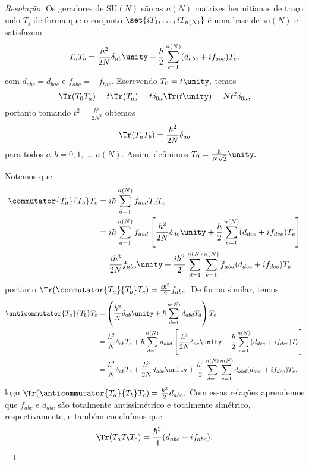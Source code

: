 \begin{proof}[Resolução]
    Os geradores de \(\mathrm{SU}(N)\) são as \(n(N)\) matrizes hermitianas de traço nulo \(T_j\) de forma que o conjunto \(\set{i T_1, \dots, i T_{n(N)}}\) é uma base de \(\mathrm{su}(N)\) e satisfazem
    \begin{equation*}
        T_a T_b = \frac{\hbar^2}{2N} \delta_{ab} \unity + \frac{\hbar}{2} \sum_{c = 1}^{n(N)} (d_{abc} + i f_{abc}) T_c,
    \end{equation*}
    com \(d_{abc} = d_{bac}\) e \(f_{abc} = -f_{bac}.\) Escrevendo \(T_0 = t \unity,\) temos
    \begin{equation*}
        \Tr(T_0 T_a) = t \Tr(T_a) = t \delta_{0a} \Tr(t \unity) = N t^2 \delta_{0a},
    \end{equation*}
    portanto tomando \(t^2 = \frac{\hbar^2}{2N^2}\) obtemos
    \begin{equation*}
        \Tr(T_a T_b) = \frac{\hbar^2}{2N} \delta_{ab}
    \end{equation*}
    para todos \(a,b = 0, 1, \dots, n(N).\) Assim, definimos \(T_0 = \frac{\hbar}{N\sqrt{2}}\unity.\)

    Notemos que
    \begin{align*}
        \commutator{T_a}{T_b}T_c &= i\hbar \sum_{d = 1}^{n(N)} f_{abd} T_d T_c\\
                                 &= i\hbar \sum_{d = 1}^{n(N)} f_{abd}\left[\frac{\hbar^2}{2N} \delta_{dc} \unity + \frac{\hbar}{2} \sum_{e = 1}^{n(N)} (d_{dce} + if_{dce}) T_e\right]\\
                                 &= \frac{i \hbar^3}{2N} f_{abc} \unity + \frac{i\hbar^2}{2} \sum_{d = 1}^{n(N)} \sum_{e = 1}^{n(N)} f_{abd}(d_{dce} + i f_{dce}) T_e
    \end{align*}
    portanto \(\Tr(\commutator{T_a}{T_b}T_c) = \frac{i\hbar^3}{2}f_{abc}\). De forma similar, temos
    \begin{align*}
        \anticommutator{T_a}{T_b}T_c &= \left(\frac{\hbar^2}{N}\delta_{ab} \unity + \hbar \sum_{d = 1}^{n(N)} d_{abd} T_d\right)T_c\\
                                     &= \frac{\hbar^2}{N} \delta_{ab} T_c + \hbar \sum_{d = 1}^{n(N)} d_{abd} \left[\frac{\hbar^2}{2N}\delta_{dc} \unity + \frac{\hbar}{2}\sum_{e = 1}^{n(N)} (d_{dce} + i f_{dce})T_e \right]\\
                                     &= \frac{\hbar^2}{N} \delta_{ab} T_c + \frac{\hbar^3}{2N} d_{abc} \unity + \frac{\hbar^2}{2} \sum_{d = 1}^{n(N)} \sum_{e = 1}^{n(N)} d_{abd} (d_{dce} + i f_{dce}) T_e,
    \end{align*}
    logo \(\Tr(\anticommutator{T_a}{T_b}T_c) = \frac{\hbar^3}{2}d_{abc}.\) Com essas relações aprendemos que \(f_{abc}\) e \(d_{abc}\) são totalmente antissimétrico e totalmente simétrico, respectivamente, e também concluímos que
    \begin{equation*}
        \Tr(T_a T_b T_c) = \frac{\hbar^3}{4} (d_{abc} + i f_{abc}).
    \end{equation*}


\end{proof}

